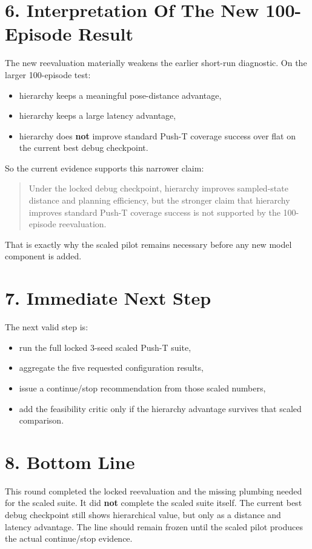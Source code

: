 \documentclass[11pt]{article}
\begin{document}
\section*{6. Interpretation Of The New 100-Episode Result}

The new reevaluation materially weakens the earlier short-run diagnostic.
On the larger 100-episode test:

\begin{itemize}
\item hierarchy keeps a meaningful pose-distance advantage,
\item hierarchy keeps a large latency advantage,
\item hierarchy does \textbf{not} improve standard Push-T coverage success over flat on the current best debug checkpoint.
\end{itemize}

So the current evidence supports this narrower claim:

\begin{quote}
Under the locked debug checkpoint, hierarchy improves sampled-state distance and planning efficiency, but the stronger claim that hierarchy improves standard Push-T coverage success is not supported by the 100-episode reevaluation.
\end{quote}

That is exactly why the scaled pilot remains necessary before any new model component is added.

\section*{7. Immediate Next Step}

The next valid step is:

\begin{itemize}
\item run the full locked 3-seed scaled Push-T suite,
\item aggregate the five requested configuration results,
\item issue a continue/stop recommendation from those scaled numbers,
\item add the feasibility critic only if the hierarchy advantage survives that scaled comparison.
\end{itemize}

\section*{8. Bottom Line}

This round completed the locked reevaluation and the missing plumbing needed for the scaled suite.
It did \textbf{not} complete the scaled suite itself.
The current best debug checkpoint still shows hierarchical value, but only as a distance and latency advantage.
The line should remain frozen until the scaled pilot produces the actual continue/stop evidence.
\end{document}
